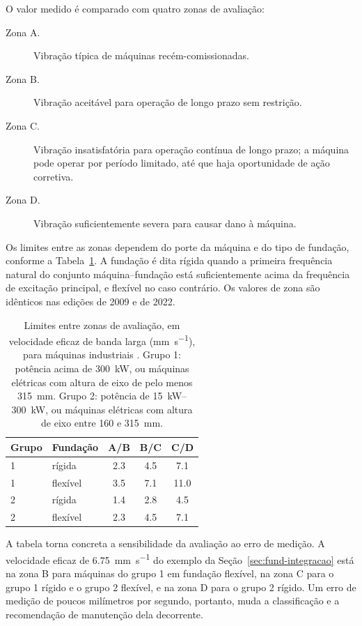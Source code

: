 O valor medido é comparado com quatro zonas de avaliação:

\begin{description}
  \item[Zona A.] Vibração típica de máquinas recém-comissionadas.
  \item[Zona B.] Vibração aceitável para operação de longo prazo sem restrição.
  \item[Zona C.] Vibração insatisfatória para operação contínua de longo prazo; a máquina
        pode operar por período limitado, até que haja oportunidade de ação corretiva.
  \item[Zona D.] Vibração suficientemente severa para causar dano à máquina.
\end{description}

Os limites entre as zonas dependem do porte da máquina e do tipo de fundação, conforme a
Tabela~\ref{tab:fund-zonas}. A fundação é dita rígida quando a primeira frequência natural
do conjunto máquina--fundação está suficientemente acima da frequência de excitação
principal, e flexível no caso contrário. Os valores de zona são idênticos nas edições de
2009 e de 2022.

\begin{table}[!htb]
\centering
\caption{Limites entre zonas de avaliação, em velocidade eficaz de banda larga
(\si{\milli\meter\per\second}), para máquinas industriais \cite{iso208163_2022}. Grupo 1:
potência acima de \SI{300}{\kilo\watt}, ou máquinas elétricas com altura de eixo de pelo
menos \SI{315}{\milli\meter}. Grupo 2: potência de \SIrange{15}{300}{\kilo\watt}, ou
máquinas elétricas com altura de eixo entre \num{160} e \SI{315}{\milli\meter}.}
\label{tab:fund-zonas}
\small
\begin{tabular}{@{}llccc@{}}
\toprule
Grupo & Fundação & A/B & B/C & C/D \\
\midrule
1 & rígida   & \num{2,3} & \num{4,5} & \num{7,1}  \\
1 & flexível & \num{3,5} & \num{7,1} & \num{11,0} \\
2 & rígida   & \num{1,4} & \num{2,8} & \num{4,5}  \\
2 & flexível & \num{2,3} & \num{4,5} & \num{7,1}  \\
\bottomrule
\end{tabular}
\end{table}

A tabela torna concreta a sensibilidade da avaliação ao erro de medição. A velocidade
eficaz de \SI{6,75}{\milli\meter\per\second} do exemplo da Seção~\ref{sec:fund-integracao}
está na zona B para máquinas do grupo 1 em fundação flexível, na zona C para o grupo 1
rígido e o grupo 2 flexível, e na zona D para o grupo 2 rígido. Um erro de medição de
poucos milímetros por segundo, portanto, muda a classificação e a recomendação de
manutenção dela decorrente.

